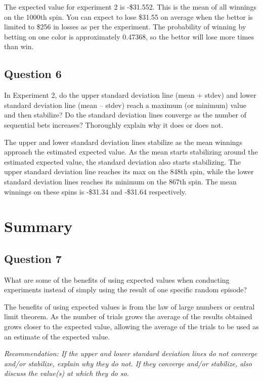 \documentclass[
	letterpaper, %
]{jdf}
\begin{document}
The expected value for experiment 2 is -\$31.552.  This is the mean of all winnings on the 1000th spin.  You can expect to lose \$31.55 on average when the bettor is limited to \$256 in losses as per the experiment.  The probability of winning by betting on one color is approximately 0.47368, so the bettor will lose more times than win.

\subsection{Question 6}
In Experiment 2, do the upper standard deviation line (mean + stdev) and lower standard deviation line (mean – stdev) reach a maximum (or minimum) value and then stabilize? Do the standard deviation lines converge as the number of sequential bets increases? Thoroughly explain why it does or does not. 

The upper and lower standard deviation lines stabilize as the mean winnings approach the estimated expected value. As the mean starts stabilizing around the estimated expected value, the standard deviation also starts stabilizing.
The upper standard deviation line reaches its max on the 848th spin, while the lower standard deviation lines reaches its minimum on the 867th spin. The mean winnings on these spins is -\$31.34 and -\$31.64 respectively.

\section{Summary}

\subsection{Question 7}
What are some of the benefits of using expected values when conducting experiments instead of simply using the result of one specific random episode? 

The benefits of using expected values is from the law of large numbers or central limit theorem.  As the number of trials grows the average of the results obtained grows closer to the expected value, allowing the average of the trials to be used as an estimate of the expected value.

\vspace{30mm}
\textit{Recommendation: If the upper and lower standard deviation lines do not converge and/or stabilize, explain why they do not. If they converge and/or stabilize, also discuss the value(s) at which they do so.} 
\end{document}
